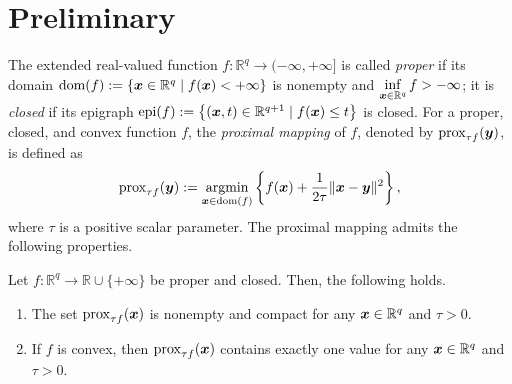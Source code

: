 \section{Preliminary}
The extended real-valued function $f: \mathbb{R}^{q}\rightarrow (-\infty, +\infty]$ is called \textit{proper} if its domain $\text{dom}(f) := \{\bm{x} \in \mathbb{R}^q\mid f(\bm{x}) < +\infty\}$ is nonempty and $\inf\limits_{\bm{x} \in \mathbb{R}^q}f > -\infty$; it is \textit{closed} if its epigraph $\text{epi}(f) := \left\{ (\bm{x}, t) \in \mathbb{R}^{q+1}\mid f(\bm{x}) \leq t \right\}$ is closed.  For a proper, closed, and convex function $f$, the \textit{proximal mapping} of $f$, denoted by $\operatorname{prox}_{\tau f}(\bm{y})$, is defined as
\begin{align}
    \operatorname{prox}_{\tau f}(\bm{y}) := \operatorname*{\mathrm{argmin}}\limits_{\bm{x} \in \operatorname{dom}(f)}\left\{ f(\bm{x}) + \frac{1}{2\tau}\|\bm{x} - \bm{y}\|^{2}\right\}, \notag
\end{align} 
where $\tau$ is a positive scalar parameter. The proximal mapping admits the following
properties.
\begin{proposition}\label{prop:rockafellar}
\textnormal{\cite{Rockafellar1998VariationalA}}
    Let $f : \mathbb{R}^{q}\rightarrow \mathbb{R}\cup \{+\infty\}$ be proper and
    closed. Then, the following holds.
    \begin{enumerate}[label=(\roman{*})]
        \item The set $\operatorname{prox}_{\tau f}(\bm{x})$ is nonempty and compact
            for any $\bm{x} \in \mathbb{R}^{q}$ and $\tau > 0$.

        \item If $f$ is convex, then $\operatorname{prox}_{\tau f}(\bm{x})$
            contains exactly one value for any $\bm{x} \in \mathbb{R}^{q}$ and
            $\tau > 0$.
    \end{enumerate}
\end{proposition}

